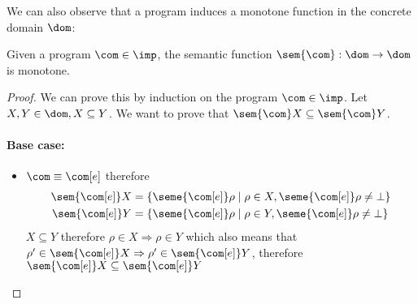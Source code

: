 We can also observe that a program induces a monotone function in the
concrete domain \(\dom\):

\begin{lemma}
  Given a program \(\com\in\imp\), the semantic function
  \(\sem{\com} : \dom \to \dom\) is monotone.
\end{lemma}

\begin{proof}
  We can prove this by induction on the program \(\com\in\imp\). Let
  \(X, Y\in\dom, X \subseteq Y\). We want to prove that
  \(\sem{\com}X \subseteq \sem{\com}Y\).

  \noindent
  \paragraph*{Base case: \\}
  \begin{itemize}
  \item \(\com \equiv \com[e]\) therefore
    \begin{align*}
      \sem{\com[e]}X & = \{\seme{\com[e]}\rho \mid \rho \in X , \seme{\com[e]}\rho \neq \bot\} \\
      \sem{\com[e]}Y & = \{\seme{\com[e]}\rho \mid \rho \in Y , \seme{\com[e]}\rho \neq \bot\} \\
    \end{align*}
    \(X\subseteq Y\) therefore \(\rho \in X \Rightarrow \rho \in Y\)
    which also means that
    \(\rho' \in \sem{\com[e]}X \Rightarrow \rho' \in \sem{\com[e]}Y\),
    therefore
    \(\sem{\com[e]}X \subseteq \sem{\com[e]}Y\)
  \end{itemize}

  \noindent

\end{proof}

